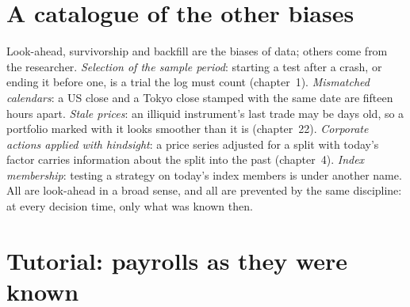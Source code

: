 \section{A catalogue of the other biases}

Look-ahead, survivorship and backfill are the biases of data; others come from the researcher. \emph{Selection of the sample
period}: starting a test after a crash, or ending it before one, is a trial the log must count (chapter~1). \emph{Mismatched
calendars}: a US close and a Tokyo close stamped with the same date are fifteen hours apart. \emph{Stale prices}: an illiquid
instrument's last trade may be days old, so a portfolio marked with it looks smoother than it is (chapter~22). \emph{Corporate
actions applied with hindsight}: a price series adjusted for a split with today's factor carries information about the split
into the past (chapter~4). \emph{Index membership}: testing a strategy on today's index members is  under
another name. All are look-ahead in a broad sense, and all are prevented by the same discipline: at every decision time, only
what was known then.

\section{Tutorial: payrolls as they were known}\label{tut:rs:point-in-time-data-and-the-biases:payrolls}

